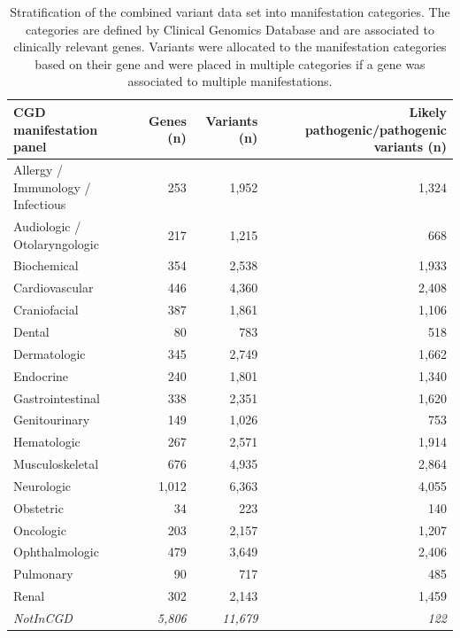\begin{table}
\begin{tabulary}{\linewidth}{LRRR}
  CGD manifestation panel & Genes (n) & Variants (n) & Likely pathogenic/pathogenic variants (n) \\
  \hline
  \rule{0pt}{2.5ex}Allergy / Immunology / Infectious & 253 & 1,952 & 1,324 \\
  \rule{0pt}{2.5ex}Audiologic / Otolaryngologic & 217 & 1,215 & 668 \\
  \rule{0pt}{2.5ex}Biochemical & 354 & 2,538 & 1,933 \\
  \rule{0pt}{2.5ex}Cardiovascular & 446 & 4,360 & 2,408 \\
  \rule{0pt}{2.5ex}Craniofacial & 387 & 1,861 & 1,106 \\
  \rule{0pt}{2.5ex}Dental & 80 & 783 & 518 \\
  \rule{0pt}{2.5ex}Dermatologic & 345 & 2,749 & 1,662 \\
  \rule{0pt}{2.5ex}Endocrine & 240 & 1,801 & 1,340 \\
  \rule{0pt}{2.5ex}Gastrointestinal & 338 & 2,351 & 1,620 \\
  \rule{0pt}{2.5ex}Genitourinary & 149 & 1,026 & 753 \\
  \rule{0pt}{2.5ex}Hematologic & 267 & 2,571 & 1,914 \\
  \rule{0pt}{2.5ex}Musculoskeletal & 676 & 4,935 & 2,864 \\
  \rule{0pt}{2.5ex}Neurologic & 1,012 & 6,363 & 4,055 \\
  \rule{0pt}{2.5ex}Obstetric & 34 & 223 & 140 \\
  \rule{0pt}{2.5ex}Oncologic & 203 & 2,157 & 1,207 \\
  \rule{0pt}{2.5ex}Ophthalmologic & 479 & 3,649 & 2,406 \\
  \rule{0pt}{2.5ex}Pulmonary & 90 & 717 & 485 \\
  \rule{0pt}{2.5ex}Renal & 302 & 2,143 & 1,459 \\
  \rule{0pt}{2.5ex}\textsl{NotInCGD} & \textsl{5,806} & \textsl{11,679} & \textsl{122} \\
  \hline
\end{tabulary}
\caption[Stratification of data set into manifestations]{Stratification of the combined variant data set into manifestation categories. The categories are defined by Clinical Genomics Database and are associated to clinically relevant genes. Variants were allocated to the manifestation categories based on their gene and were placed in multiple categories if a gene was associated to multiple manifestations.}
\label{table:gavin_variantpanels}
\end{table}


